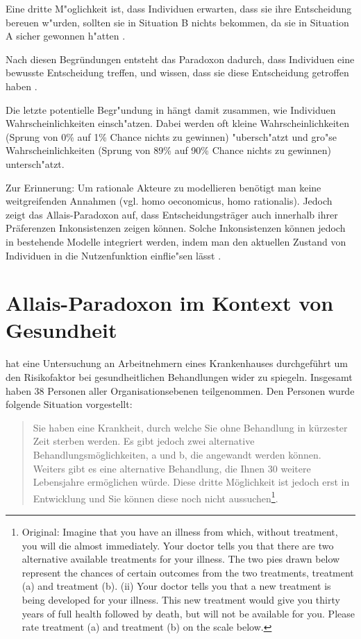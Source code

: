 \documentclass[11pt]{article}
\begin{document}
   Eine dritte M"oglichkeit ist, dass Individuen erwarten, dass sie ihre Entscheidung bereuen w"urden, sollten sie in Situation B nichts bekommen, da sie in Situation A sicher gewonnen h"atten \parencite[Bell, 1982; Loomes und Sugden, 1982; 1987a;b, in ][S. 3]{oliver2003quantitative}.
   
   Nach diesen Begr\"undungen entsteht das Paradoxon dadurch, dass Individuen eine bewusste Entscheidung treffen, und wissen, dass sie diese Entscheidung getroffen haben \parencite[vgl.][S. 17]{gintis2009bounds}. 
 
   Die letzte potentielle Begr"undung in \textcite[S. 4]{oliver2003quantitative} h\"angt damit zusammen, wie Individuen Wahrscheinlichkeiten einsch"atzen. Dabei werden oft kleine Wahrscheinlichkeiten (Sprung von 0\% auf 1\% Chance nichts zu gewinnen) "ubersch"atzt und gro"se Wahrscheinlichkeiten (Sprung von 89\% auf 90\% Chance nichts zu gewinnen) untersch"atzt.

  
   Zur Erinnerung: Um rationale Akteure zu modellieren ben\"otigt man keine weitgreifenden Annahmen (vgl. homo oeconomicus, homo rationalis). Jedoch zeigt das Allais-Paradoxon auf, dass Entscheidungstr\"ager auch innerhalb ihrer Pr\"aferenzen Inkonsistenzen zeigen k\"onnen. Solche Inkonsistenzen k\"onnen jedoch in bestehende Modelle integriert werden, indem man den aktuellen Zustand von Individuen in die Nutzenfunktion einflie"sen l\"asst \parencite[siehe Kahnemans Prospect Theory in][S. 246]{gintis2009bounds}. 
   
   
\section{Allais-Paradoxon im Kontext von Gesundheit}
\label{sec:allais-paradoxon-im}

\textcite{oliver2003quantitative} hat eine Untersuchung an Arbeitnehmern eines Krankenhauses durchgeführt um den Risikofaktor bei gesundheitlichen Behandlungen wider zu spiegeln. Insgesamt haben 38 Personen aller Organisationsebenen teilgenommen. Den Personen wurde folgende Situation vorgestellt:
\begin{quote}
  Sie haben eine Krankheit, durch welche Sie ohne Behandlung in kürzester Zeit sterben werden. Es gibt jedoch zwei alternative Behandlungsmöglichkeiten, a und b, die angewandt werden können. Weiters gibt es eine alternative Behandlung, die Ihnen 30 weitere Lebensjahre ermöglichen würde. Diese dritte Möglichkeit ist jedoch erst in Entwicklung und Sie können diese noch nicht aussuchen\footnote{Original: Imagine that you have an illness from which, without treatment, you will die almost immediately. Your doctor tells you that there are two alternative available treatments for your illness. The two pies drawn below represent the chances of certain outcomes from the two treatments, treatment (a) and treatment (b). (ii) Your doctor tells you that a new treatment is being developed for your illness. This new treatment would give you thirty years of full health followed by death, but will not be available for you. Please rate treatment (a) and treatment (b) on the scale below.}. 
\end{quote}
\end{document}
